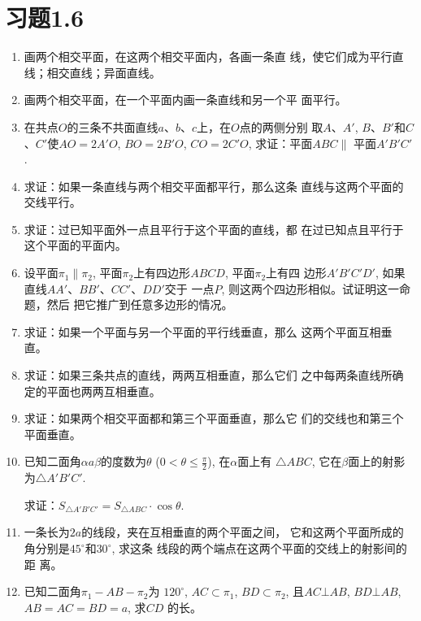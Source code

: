 \section*{习题1.6}
\begin{enumerate}
  \item 画两个相交平面，在这两个相交平面内，各画一条直
  线，使它们成为平行直线；相交直线；异面直线。
  \item 画两个相交平面，在一个平面内画一条直线和另一个平
  面平行。
  \item 在共点$O$的三条不共面直线$a$、$b$、$c$上，在$O$点的两侧分别
  取$A$、$A'$, $B$、$B'$和$C$、$C'$使$AO=2A'O$, $BO=2B'O$, 
  $CO=2C'O$, 求证：平面$ABC\parallel$ 平面$A'B'C'$.
  \item 求证：如果一条直线与两个相交平面都平行，那么这条
  直线与这两个平面的交线平行。
  \item 求证：过已知平面外一点且平行于这个平面的直线，都
  在过已知点且平行于这个平面的平面内。
  \item 设平面$\pi_1\parallel \pi_2$, 平面$\pi_2$上有四边形$ABCD$, 平面$\pi_2$上有四
  边形$A'B'C'D'$, 如果直线$AA'$、$BB'$、$CC'$、$DD'$交于
  一点$P$, 则这两个四边形相似。试证明这一命题，然后
  把它推广到任意多边形的情况。
  \item 求证：如果一个平面与另一个平面的平行线垂直，那么
  这两个平面互相垂直。
  \item 求证：如果三条共点的直线，两两互相垂直，那么它们
  之中每两条直线所确定的平面也两两互相垂直。
  \item 求证：如果两个相交平面都和第三个平面垂直，那么它
  们的交线也和第三个平面垂直。
  \item 已知二面角$\alpha a\beta$的度数为$\theta$ ($0<\theta\le \frac{\pi}{2}$), 
  在$\alpha$面上有
  $\triangle ABC$, 它在$\beta$面上的射影为$\triangle A'B'C'$. 

  求证：$S_{\triangle A'B'C'}=S_{\triangle ABC}\cdot \cos\theta$.
  \item 一条长为$2a$的线段，夹在互相垂直的两个平面之间，
  它和这两个平面所成的角分别是$45^{\circ}$和$30^{\circ}$, 求这条
  线段的两个端点在这两个平面的交线上的射影间的距
  离。
\item 已知二面角$\pi_1-AB-\pi_2$为
$120^{\circ}$, $AC\subset \pi_1$, $BD\subset \pi_2$, 
且$AC\bot AB$, $BD\bot AB$, 
$AB=AC=BD=a$, 求$CD$
的长。

\begin{figure}[htp]
  \centering
{}
\end{figure}
\end{enumerate}
